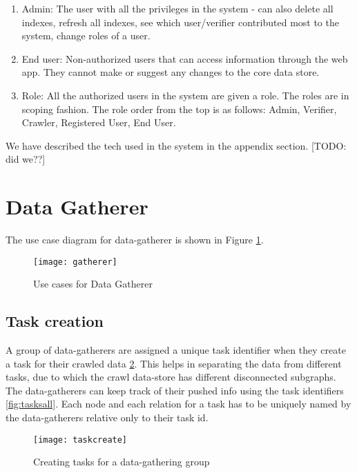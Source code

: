 \begin{enumerate}
    \item Admin: The user with all the privileges in the system - can also delete all indexes, refresh all indexes, see which user/verifier contributed most to the system, change roles of a user.

    \item End user: Non-authorized users that can access information through the web app. They cannot make or suggest any changes to the core data store.

    \item Role: All the authorized users in the system are given a role. The roles are in scoping fashion. The role order from the top is as follows: Admin, Verifier, Crawler, Registered User, End User.  

\end{enumerate}

We have described the tech used in the system in the appendix section. [TODO: did we??]



\section{Data Gatherer}

The use case diagram for data-gatherer is shown in Figure \ref{fig:gatherer}.

\begin{figure}[H]
\begin{center}  
\texttt{[image: gatherer]} 
\caption{Use cases for Data Gatherer}
\label{fig:gatherer}
\end{center}
\end{figure}


\subsection{Task creation}
A group of data-gatherers are assigned a unique task identifier when they create a task for their crawled data \ref{fig:taskcreate}. This helps in separating the data from different tasks, due to which the crawl data-store has different disconnected subgraphs. The data-gatherers can keep track of their pushed info using the task identifiers \ref{fig:tasksall}. Each node and each relation for a task has to be uniquely named by the data-gatherers relative only to their task id.


\begin{figure}[H]
\begin{center}  
\texttt{[image: taskcreate]} 
\caption{Creating tasks for a data-gathering group}
\label{fig:taskcreate}
\end{center}
\end{figure}


